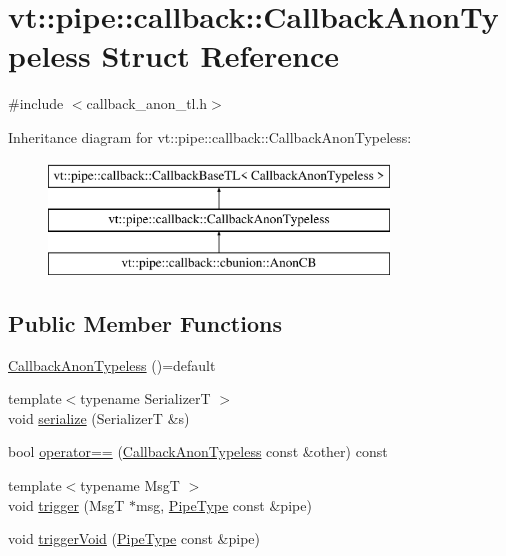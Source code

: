 \hypertarget{structvt_1_1pipe_1_1callback_1_1_callback_anon_typeless}{}\section{vt\+:\+:pipe\+:\+:callback\+:\+:Callback\+Anon\+Typeless Struct Reference}
\label{structvt_1_1pipe_1_1callback_1_1_callback_anon_typeless}


{\ttfamily \#include $<$callback\+\_\+anon\+\_\+tl.\+h$>$}

Inheritance diagram for vt\+:\+:pipe\+:\+:callback\+:\+:Callback\+Anon\+Typeless\+:\begin{figure}[H]
\begin{center}
\leavevmode
\includegraphics[height=3.000000cm]{structvt_1_1pipe_1_1callback_1_1_callback_anon_typeless}
\end{center}
\end{figure}
\subsection*{Public Member Functions}
\begin{DoxyCompactItemize}
\item 
\hyperlink{structvt_1_1pipe_1_1callback_1_1_callback_anon_typeless_ae0512a558dbda7fcbd2a9586138c7c28}{Callback\+Anon\+Typeless} ()=default
\item 
{\footnotesize template$<$typename SerializerT $>$ }\\void \hyperlink{structvt_1_1pipe_1_1callback_1_1_callback_anon_typeless_addd1f3e4d50d38e98e3d4c9f7584d3b0}{serialize} (SerializerT \&s)
\item 
bool \hyperlink{structvt_1_1pipe_1_1callback_1_1_callback_anon_typeless_ae70249373d6481ec9766854b3e119a16}{operator==} (\hyperlink{structvt_1_1pipe_1_1callback_1_1_callback_anon_typeless}{Callback\+Anon\+Typeless} const \&other) const
\item 
{\footnotesize template$<$typename MsgT $>$ }\\void \hyperlink{structvt_1_1pipe_1_1callback_1_1_callback_anon_typeless_a2e1e8131140825b88645a268ecc03053}{trigger} (MsgT $\ast$msg, \hyperlink{namespacevt_ac9852acda74d1896f48f406cd72c7bd3}{Pipe\+Type} const \&pipe)
\item 
void \hyperlink{structvt_1_1pipe_1_1callback_1_1_callback_anon_typeless_a6e43221631749153baf51d80be27cad2}{trigger\+Void} (\hyperlink{namespacevt_ac9852acda74d1896f48f406cd72c7bd3}{Pipe\+Type} const \&pipe)
\end{DoxyCompactItemize}


